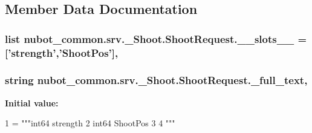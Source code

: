 \subsection{Member Data Documentation}
\hypertarget{classnubot__common_1_1srv_1_1__Shoot_1_1ShootRequest_a15319e62b3a9cba20a974a1d56563b71}{
\subsubsection[{\-\_\-\-\_\-slots\-\_\-\-\_\-}]{\setlength{\rightskip}{0pt plus 5cm}list nubot\-\_\-common.\-srv.\-\_\-\-Shoot.\-Shoot\-Request.\-\_\-\-\_\-slots\-\_\-\-\_\- = \mbox{[}'{\bf strength}','{\bf Shoot\-Pos}'\mbox{]}\hspace{0.3cm}{\ttfamily [static]}, {\ttfamily [private]}}}\label{classnubot__common_1_1srv_1_1__Shoot_1_1ShootRequest_a15319e62b3a9cba20a974a1d56563b71}
\hypertarget{classnubot__common_1_1srv_1_1__Shoot_1_1ShootRequest_a5f0a9351170558a3fc0e2ce20b1dfcc8}{
\subsubsection[{\-\_\-full\-\_\-text}]{\setlength{\rightskip}{0pt plus 5cm}string nubot\-\_\-common.\-srv.\-\_\-\-Shoot.\-Shoot\-Request.\-\_\-full\-\_\-text\hspace{0.3cm}{\ttfamily [static]}, {\ttfamily [private]}}}\label{classnubot__common_1_1srv_1_1__Shoot_1_1ShootRequest_a5f0a9351170558a3fc0e2ce20b1dfcc8}
{\bfseries Initial value\-:}
\begin{DoxyCode}
1 = \textcolor{stringliteral}{"""int64 strength}
2 \textcolor{stringliteral}{int64 ShootPos}
3 \textcolor{stringliteral}{}
4 \textcolor{stringliteral}{"""}
\end{DoxyCode}
